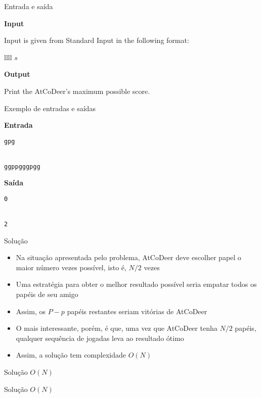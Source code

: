 \begin{frame}[fragile]{Entrada e saída}

\textbf{Input}

Input is given from Standard Input in the following format:
\begin{atcoderio}{llll}
$s$ \\
\end{atcoderio}

\textbf{Output}

Print the AtCoDeer's maximum possible score.

\end{frame}

\begin{frame}[fragile]{Exemplo de entradas e saídas}

\begin{minipage}[t]{0.55\textwidth}
\textbf{Entrada}
\begin{verbatim}
gpg


ggppgggpgg
\end{verbatim}
\end{minipage}
\begin{minipage}[t]{0.4\textwidth}
\textbf{Saída}
\begin{verbatim}
0


2
\end{verbatim}
\end{minipage}
\end{frame}

\begin{frame}[fragile]{Solução}

    \begin{itemize}
        \item Na situação apresentada pelo problema, AtCoDeer deve escolher papel o maior número
            vezes possível, isto é, $N/2$ vezes

        \item Uma estratégia para obter o melhor resultado possível seria empatar todos os papéis
            de seu amigo

        \item Assim, os $P - p$ papéis restantes seriam vitórias de AtCoDeer

        \item O mais interessante, porém, é que, uma vez que AtCoDeer tenha $N/2$ papéis, qualquer
            sequência de jogadas leva ao resultado ótimo

        \item Assim, a solução tem complexidade $O(N)$

    \end{itemize}

\end{frame}

\begin{frame}[fragile]{Solução $O(N)$}
\end{frame}

\begin{frame}[fragile]{Solução $O(N)$}
\end{frame}
